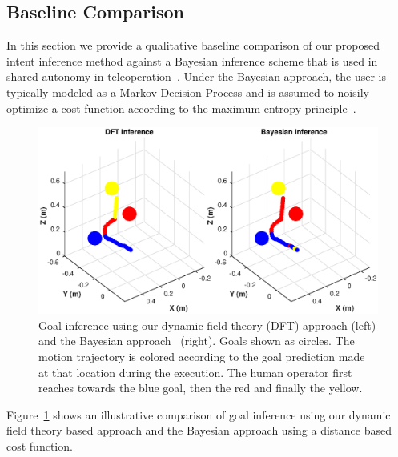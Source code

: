 \documentclass[natbib, twocolumn]{svjour3}          %
\begin{document}
\subsection{Baseline Comparison}\label{ssec:baseline}
In this section we provide a qualitative baseline comparison of our proposed intent inference method against a Bayesian inference scheme that is used in shared autonomy in teleoperation~\citep{dragan2012assistive,admoni2016predicting, javdani2017shared}. Under the Bayesian approach, the user is typically modeled as a Markov Decision Process and is assumed to noisily optimize a cost function according to the maximum entropy principle~\citep{ziebart2008maximum}. 

\begin{figure}[t]
	\centering
	\includegraphics[width = 1\hsize, height = 0.18\vsize]{Fig5.eps}
	\caption{Goal inference using our dynamic field theory (DFT) approach (left) and the Bayesian approach~\cite{dragan2013policy} (right). Goals shown as circles. The motion trajectory is colored according to the goal prediction made at that location during the execution. The human operator first reaches towards the blue goal, then the red and finally the yellow.}
	\label{fig:intent_comp}
\end{figure}
Figure~\ref{fig:intent_comp} shows an illustrative comparison of goal inference using our dynamic field theory based approach and the Bayesian approach using a distance based cost function.
\end{document}
